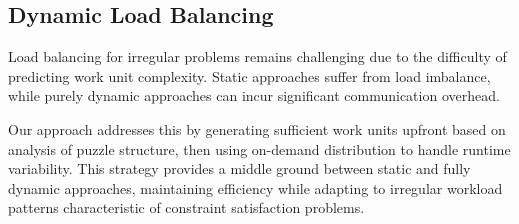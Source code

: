 \subsection{Dynamic Load Balancing}
\label{subsec:dynamic_load_balancing}
Load balancing for irregular problems remains challenging due to the difficulty of predicting work unit complexity. Static approaches suffer from load imbalance, while purely dynamic approaches can incur significant communication overhead.

Our approach addresses this by generating sufficient work units upfront based on analysis of puzzle structure, then using on-demand distribution to handle runtime variability. This strategy provides a middle ground between static and fully dynamic approaches, maintaining efficiency while adapting to irregular workload patterns characteristic of constraint satisfaction problems.
